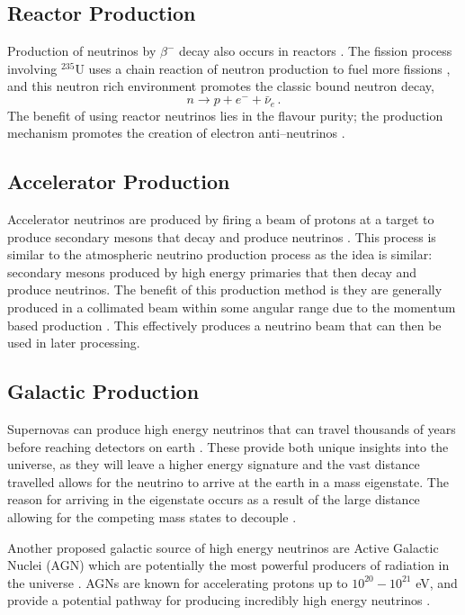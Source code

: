 \subsection{Reactor Production}
Production of neutrinos by $\beta^{-}$ decay also occurs in reactors \cite{re_nu}. The fission process involving $^{235}$U uses a chain reaction of neutron production to fuel more fissions \cite{re_nu}, and this neutron rich environment promotes the classic bound neutron decay,
\begin{equation}
  n \to p + e^{-} + \bar{\nu}_{e}\, .
\end{equation}
The benefit of using reactor neutrinos lies in the flavour purity; the production mechanism promotes the creation of electron anti--neutrinos \cite{re_nu}.

\subsection{Accelerator Production}
Accelerator neutrinos are produced by firing a beam of protons at a target to produce secondary mesons that decay and produce neutrinos \cite{acc_nu}. This process is similar to the atmospheric neutrino production process as the idea is similar: secondary mesons produced by high energy primaries that then decay and produce neutrinos. The benefit of this production method is they are generally produced in a collimated beam within some angular range due to the momentum based production \cite{acc_nu}. This effectively produces a neutrino beam that can then be used in later processing.

\subsection{Galactic Production}
Supernovas can produce high energy neutrinos that can travel thousands of years before reaching detectors on earth \cite{sup_nu}. These provide both unique insights into the universe, as they will leave a higher energy signature \cite{sup_nu} and the vast distance travelled allows for the neutrino to arrive at the earth in a mass eigenstate. The reason for arriving in the eigenstate occurs as a result of the large distance allowing for the competing mass states to decouple \cite{sup_nu}. 

Another proposed galactic source of high energy neutrinos are Active Galactic Nuclei (AGN) which are potentially the most powerful producers of radiation in the universe \cite{agn_nu}. AGNs are known for accelerating protons up to $10^{20} - 10^{21}$ eV, and provide a potential pathway for producing incredibly high energy neutrinos \cite{agn_nu}.

